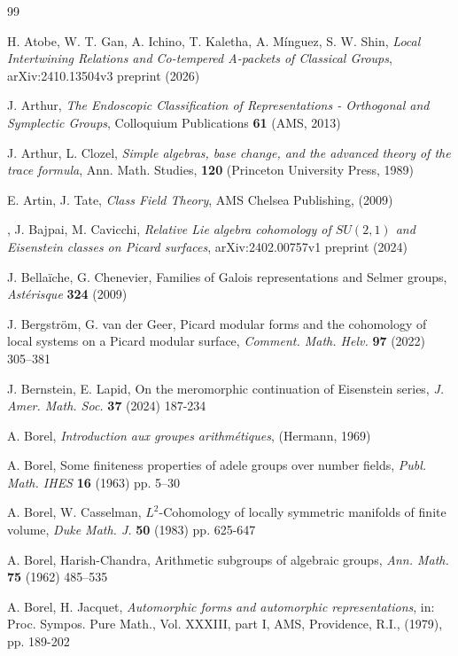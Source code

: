 \documentclass[a4paper,10pt]{amsart}
\theoremstyle{definition}
\numberwithin{equation}{section}
\begin{document}
\begin{thebibliography}{99}

 H. Atobe, W. T. Gan, A. Ichino, T. Kaletha, A. Mínguez, S. W. Shin, {\it Local Intertwining Relations and Co-tempered A-packets of Classical Groups}, arXiv:2410.13504v3 preprint (2026)


 J. Arthur, {\it The Endoscopic Classification of Representations - Orthogonal and Symplectic Groups}, Colloquium Publications {\bf 61} (AMS, 2013)

 J. Arthur, L. Clozel, {\it Simple algebras, base change, and the advanced theory of the trace formula}, Ann. Math. Studies, {\bf 120} (Princeton University Press, 1989)

 E. Artin, J. Tate, \emph{Class Field Theory}, AMS Chelsea Publishing, (2009)

, J. Bajpai, M. Cavicchi, {\it Relative Lie algebra cohomology of $SU(2,1)$ and Eisenstein classes on Picard surfaces}, arXiv:2402.00757v1 preprint (2024)

 J. Bella\"iche, G. Chenevier, Families of Galois representations and Selmer groups, {\it Ast\'erisque} {\bf 324} (2009)

 J. Bergström, G. van der Geer, Picard modular forms and the cohomology of local systems on a Picard modular surface, {\it Comment. Math. Helv.} {\bf 97} (2022) 305--381

 J. Bernstein, E. Lapid, On the meromorphic continuation of Eisenstein series, {\it J. Amer. Math. Soc.} {\bf 37} (2024) 187-234

 A. Borel, {\it Introduction aux groupes arithm\'etiques}, (Hermann, 1969)

 A. Borel, Some finiteness properties of adele groups over number fields, {\it Publ. Math. IHES} {\bf 16} (1963) pp. 5--30

 A. Borel, W. Casselman, $L^2$-Cohomology of locally symmetric manifolds of finite volume, {\it Duke Math. J.} \textbf{50} (1983) pp. 625-647

 A. Borel, Harish-Chandra, Arithmetic subgroups of algebraic groups, {\it Ann. Math.} {\bf 75} (1962) 485--535

 A. Borel, H. Jacquet, {\it Automorphic forms and automorphic representations}, in: Proc. Sympos. Pure Math., Vol. XXXIII, part I, AMS, Providence, R.I., (1979), pp. 189-202


\end{thebibliography}
\end{document}
